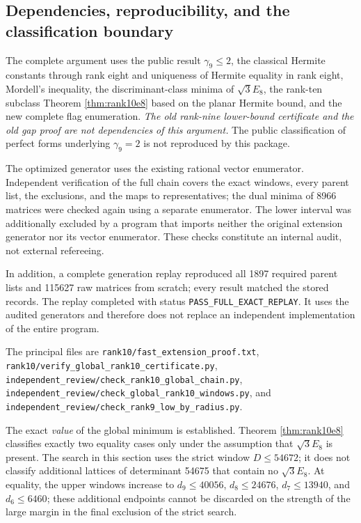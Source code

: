 \documentclass[11pt,a4paper]{article}
\theoremstyle{remark}\newtheorem{remark}[theorem]{Remark}
\newcommand{\file}[1]{{\small\nolinkurl{#1}}}
\begin{document}
\subsection{Dependencies, reproducibility, and the classification boundary}

The complete argument uses the public result $\gamma_9\le2$, the classical Hermite constants through rank eight and uniqueness of Hermite equality in rank eight, Mordell's inequality, the discriminant-class minima of $\sqrt3E_8$, the rank-ten subclass Theorem \ref{thm:rank10e8} based on the planar Hermite bound, and the new complete flag enumeration. \emph{The old rank-nine lower-bound certificate and the old gap proof are not dependencies of this argument.} The public classification of perfect forms underlying $\gamma_9=2$ is not reproduced by this package.

The optimized generator uses the existing rational vector enumerator. Independent verification of the full chain covers the exact windows, every parent list, the exclusions, and the maps to representatives; the dual minima of 8966 matrices were checked again using a separate enumerator. The lower interval was additionally excluded by a program that imports neither the original extension generator nor its vector enumerator. These checks constitute an internal audit, not external refereeing.

In addition, a complete generation replay reproduced all 1897 required parent lists and 115627 raw matrices from scratch; every result matched the stored records. The replay completed with status \file{PASS_FULL_EXACT_REPLAY}. It uses the audited generators and therefore does not replace an independent implementation of the entire program.

The principal files are \file{rank10/fast_extension_proof.txt},
\file{rank10/verify_global_rank10_certificate.py},
\file{independent_review/check_rank10_global_chain.py},
\file{independent_review/check_global_rank10_windows.py}, and
\file{independent_review/check_rank9_low_by_radius.py}.

The exact \emph{value} of the global minimum is established. Theorem \ref{thm:rank10e8} classifies exactly two equality cases only under the assumption that $\sqrt3E_8$ is present. The search in this section uses the strict window $D\le54672$; it does not classify additional lattices of determinant 54675 that contain no $\sqrt3E_8$. At equality, the upper windows increase to $d_9\le40056$, $d_8\le24676$, $d_7\le13940$, and $d_6\le6460$; these additional endpoints cannot be discarded on the strength of the large margin in the final exclusion of the strict search.
\end{document}

